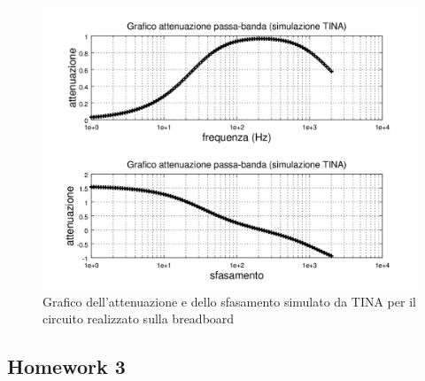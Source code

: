 \documentclass[journal, a4paper]{IEEEtran}
\begin{document}
\begin{figure}
\centering
\includegraphics[width=1.1\linewidth]{./passabanda_sfasa_tina}
\caption{Grafico dell'attenuazione e dello sfasamento simulato da TINA per il circuito realizzato sulla breadboard}
\label{fig:passabanda_sfasa_tina}
\end{figure}

\subsection{Homework 3}
\end{document}
